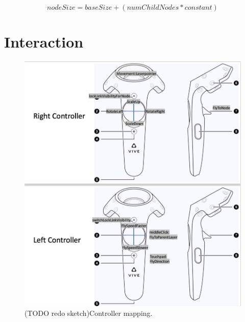 \begin{equation}
    nodeSize = baseSize + (numChildNodes * constant)
\end{equation}

\section{Interaction}
\label{chap:solution-interaction}

\begin{figure}[h]
    \centering
    \includegraphics[width=1\textwidth]{chapters/graphics/controllerMapping.jpg}
    \caption{(TODO redo sketch)Controller mapping.} 
    \label{fig:controllerMapping} 
\end{figure}

